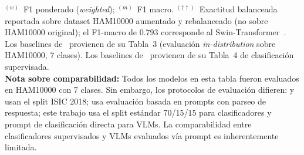 \begin{table}[htbp]
{\begin{tabular}{@{}llccrrrrr@{}}
\bottomrule
\end{tabular}%
}
\vspace{4pt}
\begin{minipage}{\textwidth}
  \footnotesize
  $^{(w)}$~F1 ponderado (\textit{weighted}); $^{(m)}$~F1 macro.
  $^{(\dagger\dagger)}$~Exactitud balanceada reportada sobre dataset HAM10000
  aumentado y rebalanceado (no sobre HAM10000 original);
  el F1-macro de 0.793 corresponde al Swin-Transformer~\cite{SkinSavvy22025}.\\
  Los baselines de~\cite{SkinR12025} provienen de su Tabla~3
  (evaluación \textit{in-distribution} sobre HAM10000, 7 clases).
  Los baselines de~\cite{MMSkin2025} provienen de su Tabla~4 de clasificación supervisada.\\[4pt]
  \textbf{Nota sobre comparabilidad:}
  Todos los modelos en esta tabla fueron evaluados en HAM10000 con 7 clases.
  Sin embargo, los protocolos de evaluación difieren:
  \cite{SkinHealthMate2024} y~\cite{SkinSavvy22025} usan el split ISIC 2018;
  \cite{SkinR12025} usa evaluación basada en prompts con parseo de respuesta;
  este trabajo usa el split estándar 70/15/15 para clasificadores y prompt
  de clasificación directa para VLMs.
  La comparabilidad entre clasificadores supervisados y VLMs evaluados
  vía prompt es inherentemente limitada.
\end{minipage}
\end{table}


